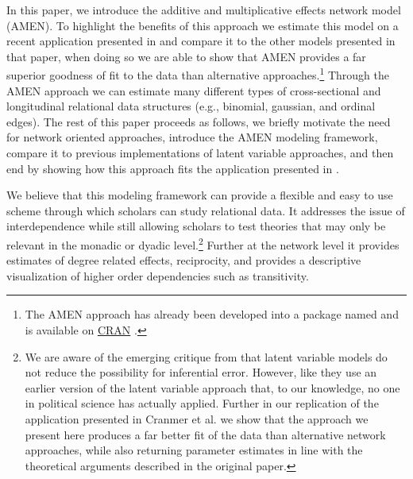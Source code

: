 In this paper, we introduce the additive and multiplicative effects network model (AMEN). To highlight the benefits of this approach we estimate this model on a recent application presented in \citet{cranmer:etal:2016} and compare it to the other models presented in that paper, when doing so we are able to show that AMEN provides a far superior goodness of fit to the data than alternative approaches.\footnote{The AMEN approach has already been developed into a package named  and is available on \href{https://cran.r-project.org/web/packages/amen/index.html}{CRAN} \citep{hoff:etal:2015}.} Through the AMEN approach we can estimate many different types of cross-sectional and longitudinal relational data structures (e.g., binomial, gaussian, and ordinal edges). The rest of this paper proceeds as follows, we briefly motivate the need for network oriented approaches, introduce the AMEN modeling framework, compare it to previous implementations of latent variable approaches, and then end by showing how this approach fits the application presented in \citet{cranmer:etal:2016}. 

We believe that this modeling framework can provide a flexible and easy to use scheme through which scholars can study relational data. It addresses the issue of interdependence while still allowing scholars to test theories that may only be relevant in the monadic or dyadic level.\footnote{We are aware of the emerging critique from \citet{jones:etal:2016} that latent variable models do not reduce the possibility for inferential error. However, like \citet{cranmer:etal:2016} they use an earlier version of the latent variable approach that, to our knowledge, no one in political science has actually applied. Further in our replication of the application presented in Cranmer et al. we show that the approach we present here produces a far better fit of the data than alternative network approaches, while also returning parameter estimates in line with the theoretical arguments described in the original paper.} Further at the network level it provides estimates of degree related effects, reciprocity, and provides a descriptive visualization of higher order dependencies such as transitivity. 



